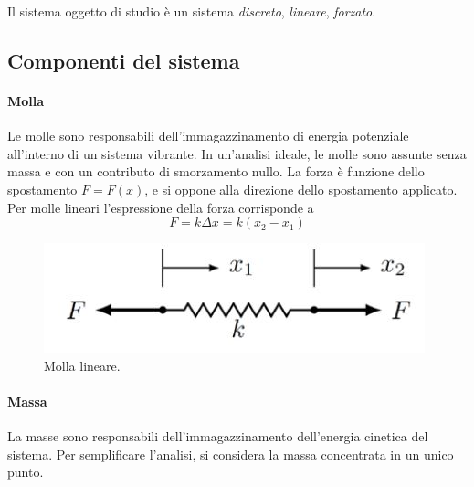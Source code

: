 Il sistema oggetto di studio è un sistema \textit{discreto}, \textit{lineare}, \textit{forzato}.
\subsection{Componenti del sistema}
\paragraph{Molla} Le molle sono responsabili dell'immagazzinamento di energia potenziale all'interno di un sistema vibrante. In un'analisi ideale, le molle sono assunte senza massa e con un contributo di smorzamento nullo. 
La forza è funzione dello spostamento $F=F(x)$, e si oppone alla direzione dello spostamento applicato. Per molle lineari l'espressione della forza corrisponde a 
\begin{equation}
    F=k \Delta x= k (x_2-x_1)
\end{equation}
\begin{figure}[h]
    \centering
    \includegraphics[scale=0.6]{MollaLineare.JPG}
    \caption{Molla lineare.}
    \label{MollaLineare}
\end{figure}
\paragraph{Massa} La masse sono responsabili dell'immagazzinamento dell'energia cinetica del sistema. Per semplificare l'analisi, si considera la massa concentrata in un unico punto.

